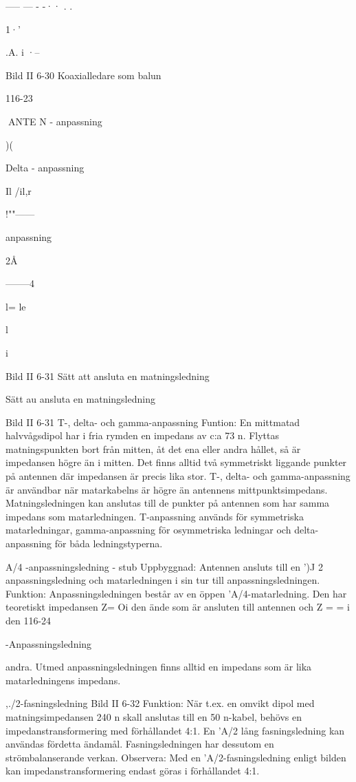 {{----- --- - -·· . .

1·'

.A.
i ·--

Bild II 6-30 Koaxialledare som balun

116-23

ANTE N
- anpassning

)(

Delta - anpassning

Il
/il,r

!""------

anpassning

2Å

--------4

l= le~

l

i

Bild II 6-31 Sätt att ansluta en matningsledning

Sätt au ansluta en matningsledning

Bild II 6-31
T-, delta- och gamma-anpassning
Funtion: En mittmatad halvvågsdipol har
i fria rymden en impedans av c:a 73 n.
Flyttas matningspunkten bort från mitten, åt det ena eller andra hållet, så är
impedansen högre än i mitten.
Det finns alltid två symmetriskt liggande
punkter på antennen där impedansen är
precis lika stor.
T-, delta- och gamma-anpassning är användbar när matarkabelns
är högre än antennens mittpunktsimpedans. Matningsledningen kan anslutas till de punkter
på antennen som har samma impedans
som matarledningen. T-anpassning används för symmetriska matarledningar, gamma-anpassning för osymmetriska ledningar
och delta-anpassning för båda ledningstyperna.

A/4 -anpassningsledning - stub
Uppbyggnad: Antennen ansluts till en ')J
2 anpassningsledning och matarledningen
i sin tur till anpassningsledningen.
Funktion: Anpassningsledningen består
av en öppen 'A/4-matarledning. Den har
teoretiskt impedansen Z= Oi den ände som
är ansluten till antennen och Z = = i den
116-24

-Anpassningsledning

andra. Utmed anpassningsledningen finns
alltid en impedans som är lika matarledningens impedans.

},./2-fasningsledning
Bild II 6-32
Funktion: När t.ex. en omvikt dipol med
matningsimpedansen 240 n skall anslutas
till en 50 n-kabel, behövs en impedanstransformering med förhållandet 4:1. En 'A/2
lång fasningsledning kan användas fördetta
ändamål. Fasningsledningen har dessutom
en strömbalanserande verkan.
Observera: Med en 'A/2-fasningsledning
enligt bilden kan impedanstransformering
endast göras i förhållandet 4:1.

}
